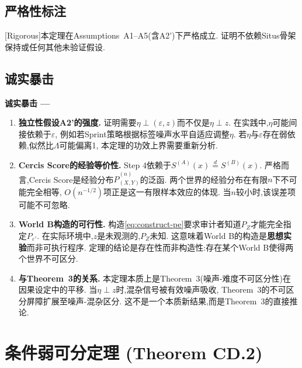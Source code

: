 \documentclass[12pt,a4paper]{article}
\newcommand{\rigorous}{\textcolor{green!50!black}{\small\textsf{[Rigorous]}}}
\newenvironment{critique}{%
    \medskip\noindent
    {\bfseries\sffamily\color{red!60!black} 诚实暴击 --- }
    \itshape\small
}{\par\medskip}
\newcommand{\indist}{\stackrel{d}{=}}
\begin{document}
\subsection{严格性标注}
\rigorous\quad 本定理在Assumptions~A1--A5(含A2')下严格成立.
证明不依赖Situs骨架保持或任何其他未验证假设.

\subsection{诚实暴击}

\begin{critique}
    \begin{enumerate}
        \item[(C1)] \textbf{独立性假设A2'的强度.}
        证明需要$\eta \perp (\varepsilon, z)$而不仅是$\eta \perp z$.
        在实践中,$\eta$可能间接依赖于$\varepsilon$,
        例如若Sprint策略根据标签噪声水平自适应调整$\eta$.
        若$\eta$与$\varepsilon$存在弱依赖,似然比$\Lambda$可能偏离1,
        本定理的功效上界需要重新分析.

        \item[(C2)] \textbf{Cercis Score的经验等价性.}
        Step 4依赖于$S^{(A)}(x) \indist S^{(B)}(x)$.
        严格而言,Cercis Score是经验分布$\hat{P}^{(n)}_{(X,Y)}$的泛函.
        两个世界的经验分布在有限$n$下不可能完全相等,
        $O(n^{-1/2})$项正是这一有限样本效应的体现.
        当$n$较小时,该误差项可能不可忽略.

        \item[(C3)] \textbf{World B构造的可行性.}
        构造\eqref{eq:construct-pe}要求审计者知道$P_Z$才能完全指定$P_{\varepsilon'}$.
        在实际环境中,$z$是未观测的,$P_Z$未知.
        这意味着World B的构造是\textbf{思想实验}而非可执行程序.
        定理的结论是存在性而非构造性:存在某个World B使得两个世界不可区分.

        \item[(C4)] \textbf{与Theorem~3的关系.}
        本定理本质上是Theorem~3(噪声-难度不可区分性)在因果设定中的平移.
        当$\eta\perp z$时,混杂信号被有效噪声吸收,
        Theorem~3的不可区分屏障扩展至噪声-混杂区分.
        这不是一个本质新结果,而是Theorem~3的直接推论.
    \end{enumerate}
\end{critique}


\section{条件弱可分定理 (Theorem CD.2)}
\label{sec:weak}
\end{document}
